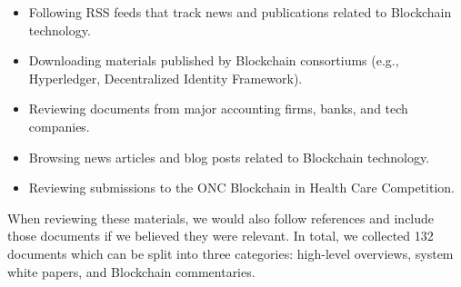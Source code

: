 \begin{itemize}
	\item Following RSS feeds that track news and publications related to 
	Blockchain technology.%
	\item Downloading materials published by Blockchain consortiums (e.g., 
	Hyperledger, Decentralized Identity Framework).%
	\item Reviewing documents from major accounting firms, banks, and tech companies.
	\item Browsing news articles and blog posts related to Blockchain technology.%
	\item Reviewing submissions to the ONC Blockchain in Health Care Competition.
\end{itemize}

When reviewing these materials, we would also follow references and include those documents if we believed they were relevant.
In total, we collected 132 documents which can be split into three categories: high-level overviews, system white papers, and Blockchain commentaries.


